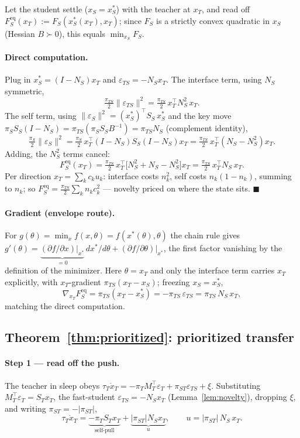\documentclass[10pt,letterpaper]{article}
\theoremstyle{plain}
\theoremstyle{remark}
\newcommand{\eps}{\varepsilon}
\newcommand{\xT}{x_T}
\newcommand{\xS}{x_S}
\newcommand{\MT}{M_T}
\newcommand{\ST}{S_T}
\renewcommand{\SS}{S_S}
\newcommand{\NS}{N_S}
\newcommand{\FS}{F_S}
\newcommand{\FSeq}{F_S^{\mathrm{eq}}}
\newcommand{\epsT}{\eps_T}
\newcommand{\epsS}{\eps_S}
\newcommand{\epsTS}{\eps_{TS}}
\newcommand{\piT}{\pi_T}
\newcommand{\piS}{\pi_S}
\newcommand{\piTS}{\pi_{TS}}
\newcommand{\piST}{\pi_{ST}}
\newcommand{\tauT}{\tau_T}
\newcommand{\tr}{^{\!\top}}
\begin{document}
Let the student settle ($\xS=\xS^{*}$) with the teacher at $\xT$, and read off
$\FSeq(\xT):=\FS(\xS^{*}(\xT),\xT)$; since $\FS$ is a strictly convex quadratic in $\xS$ (Hessian $B\succ0$),
this equals $\min_{\xS}\FS$.

\paragraph{Direct computation.} Plug in $\xS^{*}=(I-\NS)\xT$ and $\epsTS=-\NS\xT$. The interface term,
using $\NS$ symmetric,
\[
\tfrac{\piTS}{2}\|\epsTS\|^2=\tfrac{\piTS}{2}\,\xT\tr\NS^2\,\xT.
\]
The self term, using $\|\epsS\|^2=(\xS^{*})\tr\SS\,\xS^{*}$ and the key move
$\piS\SS(I-\NS)=\piTS(\piS\SS B^{-1})=\piTS\NS$ (complement identity),
\[
\tfrac{\piS}{2}\|\epsS\|^2=\tfrac{\piS}{2}\,\xT\tr(I-\NS)\SS(I-\NS)\xT=\tfrac{\piTS}{2}\,\xT\tr(\NS-\NS^2)\xT.
\]
Adding, the $\NS^2$ terms cancel:
\[
\FSeq(\xT)=\tfrac{\piTS}{2}\,\xT\tr\big[\NS^2+\NS-\NS^2\big]\xT=\tfrac{\piTS}{2}\,\xT\tr\NS\,\xT.
\]
Per direction $\xT=\sum_k c_k u_k$: interface costs $n_k^2$, self costs $n_k(1-n_k)$, summing to $n_k$;
so $\FSeq=\tfrac{\piTS}{2}\sum_k n_k c_k^2$ --- novelty priced on where the state sits.
\hfill$\blacksquare$

\paragraph{Gradient (envelope route).} For $g(\theta)=\min_x f(x,\theta)=f(x^{*}(\theta),\theta)$ the chain
rule gives $g'(\theta)=\underbrace{(\partial f/\partial x)|_{x^{*}}}_{=0}\,dx^{*}/d\theta+(\partial
f/\partial\theta)|_{x^{*}}$, the first factor vanishing by the definition of the minimizer. Here
$\theta=\xT$ and only the interface term carries $\xT$ explicitly, with $\xT$-gradient $\piTS(\xT-\xS)$;
freezing $\xS=\xS^{*}$,
\[
\nabla_{\xT}\FSeq=\piTS(\xT-\xS^{*})=-\piTS\,\epsTS=\piTS\,\NS\,\xT,
\]
matching the direct computation.

\subsection{Theorem~\ref{thm:prioritized}: prioritized transfer}
\label{app:thm1}

\paragraph{Step 1 --- read off the push.} The teacher in sleep obeys
$\tauT\dot\xT=-\piT\MT\tr\epsT+\piST\epsTS+\xi$. Substituting $\MT\tr\epsT=\ST\xT$, the fast-student
$\epsTS=-\NS\xT$ (Lemma~\ref{lem:novelty}), dropping $\xi$, and writing $\piST=-|\piST|$,
\[
\tauT\dot\xT=\underbrace{-\piT\ST\xT}_{\text{self-pull}}+\underbrace{|\piST|\NS\xT}_{u},
\qquad u=|\piST|\,\NS\,\xT.
\]
\end{document}
